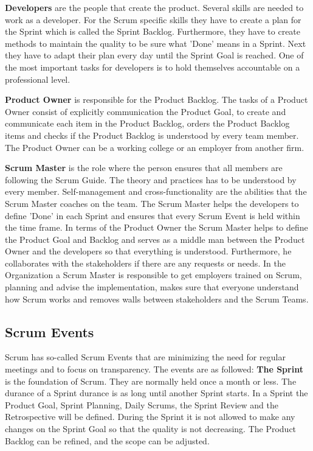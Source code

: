 \textbf{Developers} are the people that create the product. Several skills are needed to work as a developer. For the Scrum specific skills they have to create a plan for the Sprint which is called the Sprint Backlog. Furthermore, they have to create methods to maintain the quality to be sure what 'Done' means in a Sprint. Next they have to adapt their plan every day until the Sprint Goal is reached. One of the most important tasks for developers is to hold themselves accountable on a professional level. \cite{scrum_guide}

\textbf{Product Owner} is responsible for the Product Backlog. The tasks of a Product Owner consist of explicitly communication the Product Goal, to create and communicate each item in the Product Backlog, orders the Product Backlog items and checks if the Product Backlog is understood by every team member. \cite{scrum_guide} The Product Owner can be a working college or an employer from another firm.

\textbf{Scrum Master} is the role where the person ensures that all members are following the Scrum Guide. The theory and practices has to be understood by every member. Self-management and cross-functionality are the abilities that the Scrum Master coaches on the team. The Scrum Master helps the developers to define 'Done' in each Sprint and ensures that every Scrum Event is held within the time frame. In terms of the Product Owner the Scrum Master helps to define the Product Goal and Backlog and serves as a middle man between the Product Owner and the developers so that everything is understood. Furthermore, he collaborates with the stakeholders if there are any requests or needs. In the Organization a Scrum Master is responsible to get employers trained on Scrum, planning and advise the implementation, makes sure that everyone understand how Scrum works and removes walls between stakeholders and the Scrum Teams. \cite{scrum_guide}

\subsection{Scrum Events} \label{sec:Scrum Events}
Scrum has so-called Scrum Events that are minimizing the need for regular meetings and to focus on transparency. The events are as followed:
\textbf{The Sprint} is the foundation of Scrum. They are normally held once a month or less. The durance of a Sprint durance is as long until another Sprint starts. In a Sprint the Product Goal, Sprint Planning, Daily Scrums, the Sprint Review and the Retrospective will be defined. During the Sprint it is not allowed to make any changes on the Sprint Goal so that the quality is not decreasing. The Product Backlog can be refined, and the scope can be adjusted. \cite{scrum_guide}

